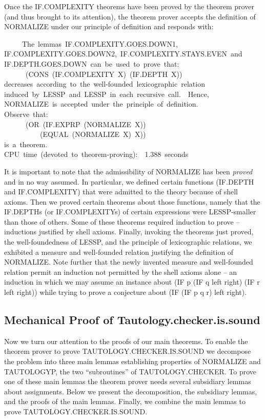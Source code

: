 \documentclass[11pt]{book}
\newenvironment{pubasis}{\begin{flushleft}\ttfamily\small}{\normalsize\rmfamily\end{flushleft}}
\newcommand{\pubinlineunderline}[1]{\emph{#1}}
\newcommand{\pubdefaulttextsize}{\large}
\begin{document}
Once the IF.COM\-PLEX\-I\-TY theorems have been proved by the theorem prover (and thus
brought to its attention), the theorem prover accepts the definition
of NORMALIZE under our principle of definition and responds with:
\begin{pubasis}
~~~~~The~lemmas~IF.COM\-PLEX\-I\-TY.GOES.DOWN1,\\
IF.COM\-PLEX\-I\-TY.GOES.DOWN2,~IF.COM\-PLEX\-I\-TY.STAYS.EVEN~and\\
IF.DEPTH.GOES.DOWN~can~be~used~to~prove~that:\\
~~~~~~(CONS~(IF.COM\-PLEX\-I\-TY~X)~(IF.DEPTH~X))\\
decreases~according~to~the~well-founded~lexicographic~relation\\
induced~by~LESSP~and~LESSP~in~each~recursive~call.~~Hence,\\
NORMALIZE~is~accepted~under~the~principle~of~definition.\\
Observe~that:\\
~~~~~~(OR~(IF.EXPRP~(NOR\-MAL\-IZE~X))\\
~~~~~~~~~~(EQUAL~(NORMALIZE~X)~X))\\
is~a~theorem.\\

CPU~time~(devoted~to~theorem-proving):~~1.388~seconds\\
\end{pubasis}
It is important to note that the admissibility of NORMALIZE has been
\pubinlineunderline{proved} and in no way assumed.  In particular, we defined certain
functions (IF.DEPTH and IF.COM\-PLEX\-I\-TY) that were admitted to the theory
because of shell axioms.  Then we proved certain theorems about those
functions, namely that the IF.DEPTHs (or IF.COM\-PLEX\-I\-TYs) of certain
expressions were LESSP-smaller than those of others.  Some of these
theorems required induction to prove -- inductions justified by shell
axioms.  Finally, invoking the theorems just proved, the
well-foundedness of LESSP, and the principle of lexicographic relations, we
exhibited a measure and well-founded relation justifying the definition
of NORMALIZE.  Note
further that the newly invented measure and well-founded relation
permit an induction not permitted by the shell axioms alone -- an induction
in which we may assume an instance about (IF p (IF q left right) (IF r left right)) while trying to prove a conjecture about (IF (IF p q r) left right).
\subsection{Mechanical Proof of Tautology.checker.is.sound}
\pubdefaulttextsize
Now we turn our attention to the proofs of our main theorems.
To enable the theorem prover to prove TAU\-TOL\-OGY.CHECK\-ER.IS.SOUND we decompose the problem
into three main lemmas establishing properties of NORMALIZE and TAUTOLOGYP,
the two ``subroutines'' of TAU\-TOL\-OGY.CHECK\-ER.  To prove one of these main lemmas
the theorem prover needs several subsidiary lemmas about assignments.  Below we present the
decomposition, the subsidiary
lemmas, and the proofs of the main lemmas.  Finally, we combine
the main lemmas to prove TAU\-TOL\-OGY.CHECK\-ER.IS.SOUND.
\end{document}
